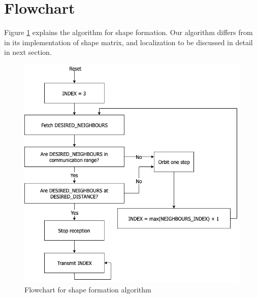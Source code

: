 \documentclass{report}[12pt]
\begin{document}
\section{Flowchart}
Figure \ref{fig:fc_shape_form} explains the algorithm for shape formation. Our algorithm differs from \cite{MR-AC-RN:2014} in its implementation of shape matrix, and localization to be discussed in detail in next section.
\begin{figure}[H]
    \centering
    \includegraphics[scale=0.6]{images/shape_formation}
    \caption{Flowchart for shape formation algorithm}
    \label{fig:fc_shape_form}
\end{figure}
\end{document}
